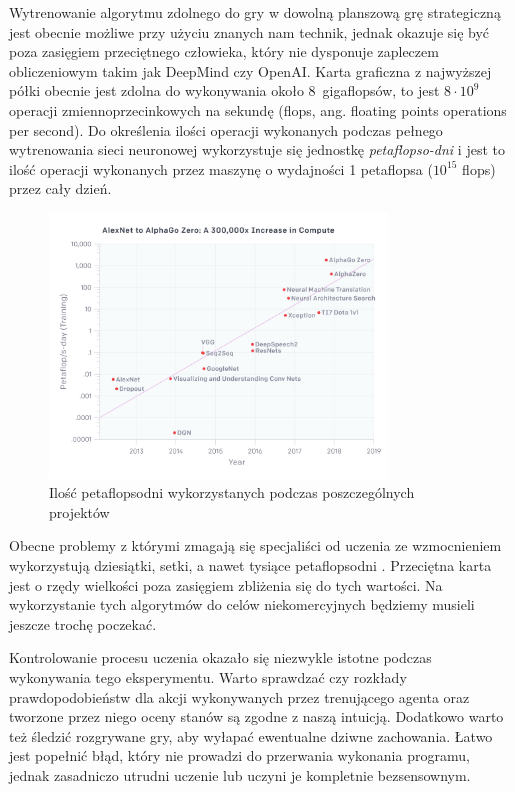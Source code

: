 \documentclass[licencjacka]{pracamgr}
\begin{document}
Wytrenowanie algorytmu zdolnego do gry w dowolną planszową grę strategiczną jest obecnie możliwe przy użyciu znanych nam technik, jednak okazuje się być poza zasięgiem przeciętnego człowieka, który nie dysponuje zapleczem obliczeniowym takim jak DeepMind czy OpenAI. Karta graficzna z najwyższej półki obecnie jest zdolna do wykonywania około 8~gigaflopsów, to jest $8 \cdot 10^9$ operacji zmiennoprzecinkowych na sekundę (flops, ang. floating points operations per second). Do określenia ilości operacji wykonanych podczas pełnego wytrenowania sieci neuronowej wykorzystuje się jednostkę \emph{petaflopso-dni} i jest to ilość operacji wykonanych przez maszynę o wydajności 1 petaflopsa ($10^{15}$ flops) przez cały dzień. 

\begin{figure}[ht]
  \centering
  \includegraphics[width=0.8\textwidth]{compute}
  \caption{Ilość petaflopsodni wykorzystanych podczas poszczególnych projektów \cite{dqn, resnet, dota2, nmt, alphago2016, alphagozero}}
\end{figure}

Obecne problemy z którymi zmagają się specjaliści od uczenia ze wzmocnieniem wykorzystują dziesiątki, setki, a nawet tysiące petaflopsodni \cite{openai-compute}. Przeciętna karta jest o rzędy wielkości poza zasięgiem zbliżenia się do tych wartości. Na wykorzystanie tych algorytmów do celów niekomercyjnych będziemy musieli jeszcze trochę poczekać.

Kontrolowanie procesu uczenia okazało się niezwykle istotne podczas wykonywania tego eksperymentu. Warto sprawdzać czy rozkłady prawdopodobieństw dla akcji wykonywanych przez trenującego agenta oraz tworzone przez niego oceny stanów są zgodne z naszą intuicją. Dodatkowo warto też śledzić rozgrywane gry, aby wyłapać ewentualne dziwne zachowania. Łatwo jest popełnić błąd, który nie prowadzi do przerwania wykonania programu, jednak zasadniczo utrudni uczenie lub uczyni je kompletnie bezsensownym.
\end{document}
